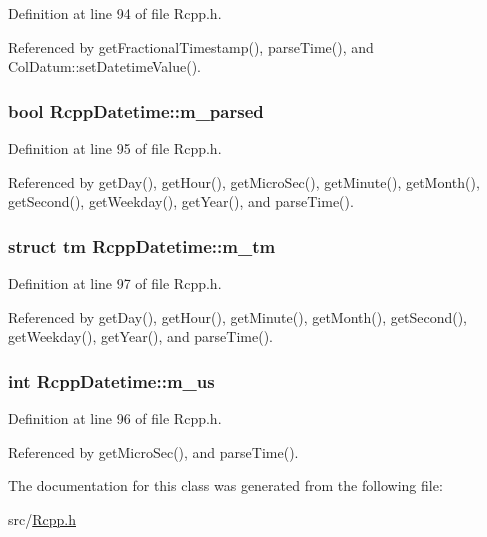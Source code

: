 Definition at line 94 of file Rcpp.h.

Referenced by getFractionalTimestamp(), parseTime(), and ColDatum::setDatetimeValue().\hypertarget{classRcppDatetime_a515e3390c1834e58ce6bba39854638ad}{
\subsubsection[{m\_\-parsed}]{\setlength{\rightskip}{0pt plus 5cm}bool {\bf RcppDatetime::m\_\-parsed}}}
\label{classRcppDatetime_a515e3390c1834e58ce6bba39854638ad}


Definition at line 95 of file Rcpp.h.

Referenced by getDay(), getHour(), getMicroSec(), getMinute(), getMonth(), getSecond(), getWeekday(), getYear(), and parseTime().\hypertarget{classRcppDatetime_a3f65c708657270208656c1be885e9f1b}{
\subsubsection[{m\_\-tm}]{\setlength{\rightskip}{0pt plus 5cm}struct tm {\bf RcppDatetime::m\_\-tm}}}
\label{classRcppDatetime_a3f65c708657270208656c1be885e9f1b}


Definition at line 97 of file Rcpp.h.

Referenced by getDay(), getHour(), getMinute(), getMonth(), getSecond(), getWeekday(), getYear(), and parseTime().\hypertarget{classRcppDatetime_a68b9c7b759ffbba14aca3ae0680ea8a4}{
\subsubsection[{m\_\-us}]{\setlength{\rightskip}{0pt plus 5cm}int {\bf RcppDatetime::m\_\-us}}}
\label{classRcppDatetime_a68b9c7b759ffbba14aca3ae0680ea8a4}


Definition at line 96 of file Rcpp.h.

Referenced by getMicroSec(), and parseTime().

The documentation for this class was generated from the following file:\begin{DoxyCompactItemize}
\item 
src/\hyperlink{Rcpp_8h}{Rcpp.h}\end{DoxyCompactItemize}
